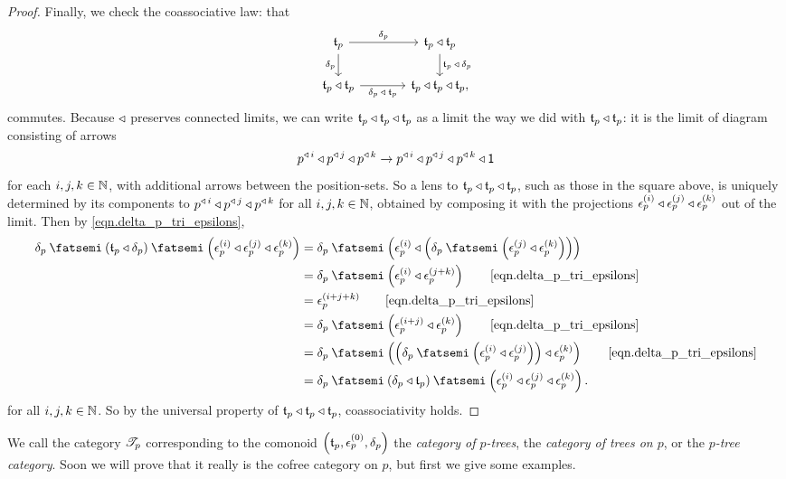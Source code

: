 \documentclass[Book-Poly]{subfiles}
\begin{document}
\begin{proof}
Finally, we check the coassociative law: that
\[
\begin{tikzcd}[column sep=large]
	\ema{t}_p\ar[r, "\delta_p"]\ar[d, "\delta_p"']&
	\ema{t}_p\tri\ema{t}_p\ar[d, "\ema{t}_p\:\tri\:\delta_p"]\\
	\ema{t}_p\tri\ema{t}_p\ar[r, "\delta_p\:\tri\:\ema{t}_p"']&
	\ema{t}_p\tri\ema{t}_p\tri\ema{t}_p,
\end{tikzcd}
\]
commutes.
Because $\mathbin{\triangleleft}$ preserves connected limits, we can write $\mathfrak{t}_p\mathbin{\triangleleft}\mathfrak{t}_p\mathbin{\triangleleft}\mathfrak{t}_p$ as a limit the way we did with $\mathfrak{t}_p\mathbin{\triangleleft}\mathfrak{t}_p$: it is the limit of diagram consisting of arrows
\[
    p^{\mathbin{\triangleleft}\,i}\mathbin{\triangleleft} p^{\mathbin{\triangleleft}\,j}\mathbin{\triangleleft} p^{\mathbin{\triangleleft}\,k}\to p^{\mathbin{\triangleleft}\,i}\mathbin{\triangleleft} p^{\mathbin{\triangleleft}\,j}\mathbin{\triangleleft} p^{\mathbin{\triangleleft}\,k}\mathbin{\triangleleft}\textsf{1}
\]
for each $i,j,k\in\mathbb{N}$, with additional arrows between the position-sets.
So a lens to $\mathfrak{t}_p\mathbin{\triangleleft}\mathfrak{t}_p\mathbin{\triangleleft}\mathfrak{t}_p$, such as those in the square above, is uniquely determined by its components to $p^{\mathbin{\triangleleft}\,i}\mathbin{\triangleleft} p^{\mathbin{\triangleleft}\,j}\mathbin{\triangleleft} p^{\mathbin{\triangleleft}\,k}$ for all $i,j,k\in\mathbb{N}$, obtained by composing it with the projections $\epsilon^{(i)}_p\mathbin{\triangleleft}\epsilon^{(j)}_p\mathbin{\triangleleft}\epsilon^{(k)}_p$ out of the limit.
Then by \eqref{eqn.delta_p_tri_epsilons},
\begin{align*}
    \delta_p\then\left(\ema{t}_p\tri\delta_p\right)\then\left(\epsilon^{(i)}_p\tri\epsilon^{(j)}_p\tri\epsilon^{(k)}_p\right) &=
    \delta_p\then\left(\epsilon^{(i)}_p\tri\left(\delta_p\then\left(\epsilon^{(j)}_p\tri\epsilon^{(k)}_p\right)\right)\right) \\ &=
    \delta_p\then\left(\epsilon^{(i)}_p\tri\epsilon^{(j+k)}_p\right) \tag*{\eqref{eqn.delta_p_tri_epsilons}} \\ &=
    \epsilon^{(i+j+k)}_p \tag*{\eqref{eqn.delta_p_tri_epsilons}} \\ &=
    \delta_p\then\left(\epsilon^{(i+j)}_p\tri\epsilon^{(k)}_p\right) \tag*{\eqref{eqn.delta_p_tri_epsilons}} \\ &=
    \delta_p\then\left(\left(\delta_p\then\left(\epsilon^{(i)}_p\tri\epsilon^{(j)}_p\right)\right)\tri\epsilon^{(k)}_p\right) \tag*{\eqref{eqn.delta_p_tri_epsilons}} \\ &=
    \delta_p\then\left(\delta_p\tri\ema{t}_p\right)\then\left(\epsilon^{(i)}_p\tri\epsilon^{(j)}_p\tri\epsilon^{(k)}_p\right).
\end{align*}
for all $i,j,k\in\mathbb{N}$.
So by the universal property of $\mathfrak{t}_p\mathbin{\triangleleft}\mathfrak{t}_p\mathbin{\triangleleft}\mathfrak{t}_p$, coassociativity holds.
\end{proof}

We call the category $\mathscr{T}_{p}$ corresponding to the comonoid $\left(\mathfrak{t}_p,\epsilon^{(0)}_p,\delta_p\right)$ the \emph{category of $p$-trees}, the \emph{category of trees on $p$}, or the \emph{$p$-tree category}.
Soon we will prove that it really is the cofree category on $p$, but first we give some examples.
\end{document}
